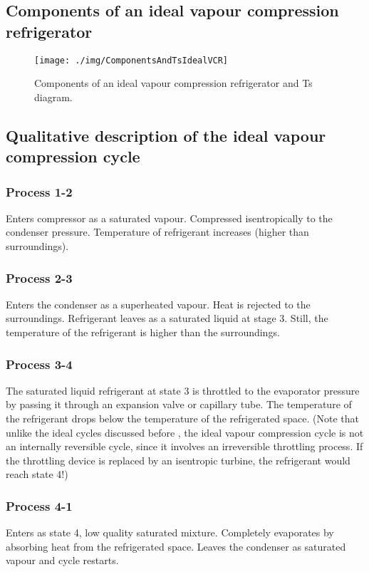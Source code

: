 \subsection{Components of an ideal vapour compression refrigerator}
\begin{figure}
  \centering
  \texttt{[image: ./img/ComponentsAndTsIdealVCR]}
  \caption{Components of an ideal vapour compression refrigerator and Ts diagram.}
\end{figure}
\subsection{Qualitative description of the ideal vapour compression cycle}
\subsubsection{Process 1-2}
Enters compressor as a saturated vapour. Compressed isentropically to the condenser pressure. Temperature of refrigerant increases (higher than surroundings).
\subsubsection{Process 2-3}
Enters the condenser as a superheated vapour. Heat is rejected to the surroundings. Refrigerant leaves as a saturated liquid at stage 3. Still, the temperature of the refrigerant is higher than the surroundings.
\subsubsection{Process 3-4}
The saturated liquid refrigerant at state 3 is throttled to the evaporator pressure by passing it through an expansion valve or capillary tube. The temperature of the refrigerant drops below the temperature of the refrigerated space. (Note that unlike the ideal cycles discussed before , the ideal vapour compression cycle is not an internally reversible cycle, since it involves an irreversible throttling process. If the throttling device is replaced by an isentropic turbine, the refrigerant would reach state 4!)
\subsubsection{Process 4-1}
Enters as state 4, low quality saturated mixture. Completely evaporates by absorbing heat from the refrigerated space. Leaves the condenser as saturated vapour and cycle restarts.

